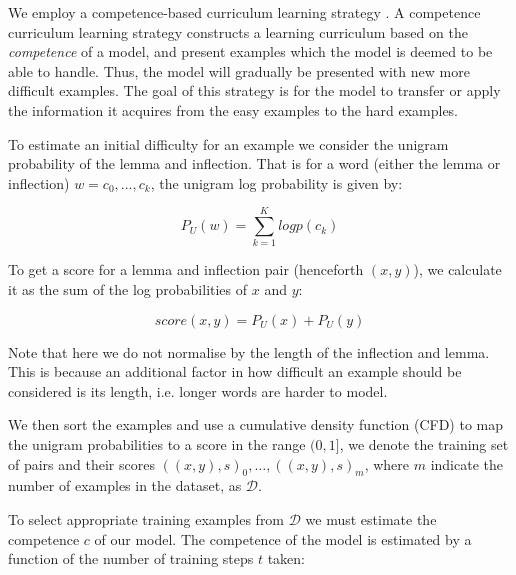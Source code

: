 \documentclass[11pt,a4paper]{article}
\begin{document}
We employ a competence-based curriculum learning strategy
\cite{DBLP:conf/acl/LiuLWC20, platanios2019competence}. A competence
curriculum learning strategy constructs a learning curriculum based on
the \textit{competence} of a model, and present examples which the
model is deemed to be able to handle. Thus, the model will gradually
be presented with new more difficult examples. The goal of this
strategy is for the model to transfer or apply the information it
acquires from the easy examples to the hard examples.
 
To estimate an initial difficulty for an example we consider the
unigram probability of the lemma and inflection. That is for a word
(either the lemma or inflection) $w = c_0, ..., c_k$, the unigram log
probability is given by:

\begin{equation}
    P_U(w) = \sum_{k=1}^{K} logp(c_k)
\end{equation}

To get a score for a lemma and inflection pair (henceforth $(x,y)$),
we calculate it as the sum of the log probabilities of $x$ and $y$:

\begin{equation}
    score(x,y) = P_U(x) + P_U(y)
\end{equation}

Note that here we do not normalise by the length of the inflection and
lemma. This is because an additional factor in how difficult an
example should be considered is its length, i.e. longer words are
harder to model.

We then sort the examples and use a cumulative density function (CFD)
to map the unigram probabilities to a score in the range $(0, 1]$, we
denote the training set of pairs and their scores
$((x,y), s)_0, \ldots, ((x,y), s)_m$, where $m$ indicate the number of
examples in the dataset, as $\mathcal{D}$.

% 
%
To select appropriate training examples from $\mathcal{D}$ we must
estimate the competence $c$ of our model. The competence of the model
is estimated by a function of the number of training steps $t$ taken:

\end{document}
